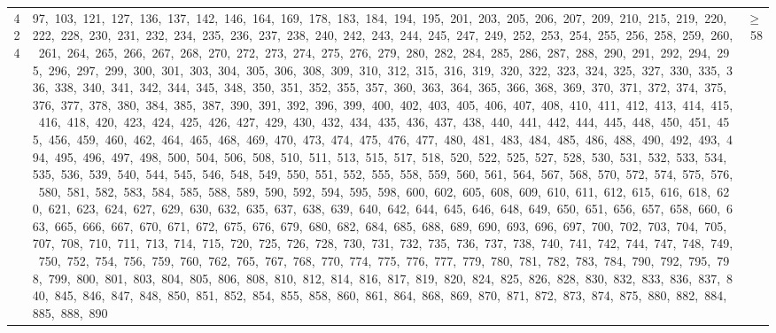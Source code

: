 \begin{longtable}{c|p{}|r}
424 & 97,\ 103,\ 121,\ 127,\ 136,\ 137,\ 142,\ 146,\ 164,\ 169,\ 178,\ 183,\ 184,\ 194,\ 195,\ 201,\ 203,\ 205,\ 206,\ 207,\ 209,\ 210,\ 215,\ 219,\ 220,\ 222,\ 228,\ 230,\ 231,\ 232,\ 234,\ 235,\ 236,\ 237,\ 238,\ 240,\ 242,\ 243,\ 244,\ 245,\ 247,\ 249,\ 252,\ 253,\ 254,\ 255,\ 256,\ 258,\ 259,\ 260,\ 261,\ 264,\ 265,\ 266,\ 267,\ 268,\ 270,\ 272,\ 273,\ 274,\ 275,\ 276,\ 279,\ 280,\ 282,\ 284,\ 285,\ 286,\ 287,\ 288,\ 290,\ 291,\ 292,\ 294,\ 295,\ 296,\ 297,\ 299,\ 300,\ 301,\ 303,\ 304,\ 305,\ 306,\ 308,\ 309,\ 310,\ 312,\ 315,\ 316,\ 319,\ 320,\ 322,\ 323,\ 324,\ 325,\ 327,\ 330,\ 335,\ 336,\ 338,\ 340,\ 341,\ 342,\ 344,\ 345,\ 348,\ 350,\ 351,\ 352,\ 355,\ 357,\ 360,\ 363,\ 364,\ 365,\ 366,\ 368,\ 369,\ 370,\ 371,\ 372,\ 374,\ 375,\ 376,\ 377,\ 378,\ 380,\ 384,\ 385,\ 387,\ 390,\ 391,\ 392,\ 396,\ 399,\ 400,\ 402,\ 403,\ 405,\ 406,\ 407,\ 408,\ 410,\ 411,\ 412,\ 413,\ 414,\ 415,\ 416,\ 418,\ 420,\ 423,\ 424,\ 425,\ 426,\ 427,\ 429,\ 430,\ 432,\ 434,\ 435,\ 436,\ 437,\ 438,\ 440,\ 441,\ 442,\ 444,\ 445,\ 448,\ 450,\ 451,\ 455,\ 456,\ 459,\ 460,\ 462,\ 464,\ 465,\ 468,\ 469,\ 470,\ 473,\ 474,\ 475,\ 476,\ 477,\ 480,\ 481,\ 483,\ 484,\ 485,\ 486,\ 488,\ 490,\ 492,\ 493,\ 494,\ 495,\ 496,\ 497,\ 498,\ 500,\ 504,\ 506,\ 508,\ 510,\ 511,\ 513,\ 515,\ 517,\ 518,\ 520,\ 522,\ 525,\ 527,\ 528,\ 530,\ 531,\ 532,\ 533,\ 534,\ 535,\ 536,\ 539,\ 540,\ 544,\ 545,\ 546,\ 548,\ 549,\ 550,\ 551,\ 552,\ 555,\ 558,\ 559,\ 560,\ 561,\ 564,\ 567,\ 568,\ 570,\ 572,\ 574,\ 575,\ 576,\ 580,\ 581,\ 582,\ 583,\ 584,\ 585,\ 588,\ 589,\ 590,\ 592,\ 594,\ 595,\ 598,\ 600,\ 602,\ 605,\ 608,\ 609,\ 610,\ 611,\ 612,\ 615,\ 616,\ 618,\ 620,\ 621,\ 623,\ 624,\ 627,\ 629,\ 630,\ 632,\ 635,\ 637,\ 638,\ 639,\ 640,\ 642,\ 644,\ 645,\ 646,\ 648,\ 649,\ 650,\ 651,\ 656,\ 657,\ 658,\ 660,\ 663,\ 665,\ 666,\ 667,\ 670,\ 671,\ 672,\ 675,\ 676,\ 679,\ 680,\ 682,\ 684,\ 685,\ 688,\ 689,\ 690,\ 693,\ 696,\ 697,\ 700,\ 702,\ 703,\ 704,\ 705,\ 707,\ 708,\ 710,\ 711,\ 713,\ 714,\ 715,\ 720,\ 725,\ 726,\ 728,\ 730,\ 731,\ 732,\ 735,\ 736,\ 737,\ 738,\ 740,\ 741,\ 742,\ 744,\ 747,\ 748,\ 749,\ 750,\ 752,\ 754,\ 756,\ 759,\ 760,\ 762,\ 765,\ 767,\ 768,\ 770,\ 774,\ 775,\ 776,\ 777,\ 779,\ 780,\ 781,\ 782,\ 783,\ 784,\ 790,\ 792,\ 795,\ 798,\ 799,\ 800,\ 801,\ 803,\ 804,\ 805,\ 806,\ 808,\ 810,\ 812,\ 814,\ 816,\ 817,\ 819,\ 820,\ 824,\ 825,\ 826,\ 828,\ 830,\ 832,\ 833,\ 836,\ 837,\ 840,\ 845,\ 846,\ 847,\ 848,\ 850,\ 851,\ 852,\ 854,\ 855,\ 858,\ 860,\ 861,\ 864,\ 868,\ 869,\ 870,\ 871,\ 872,\ 873,\ 874,\ 875,\ 880,\ 882,\ 884,\ 885,\ 888,\ 890 & $\ge$ 58 \\

\end{longtable}
